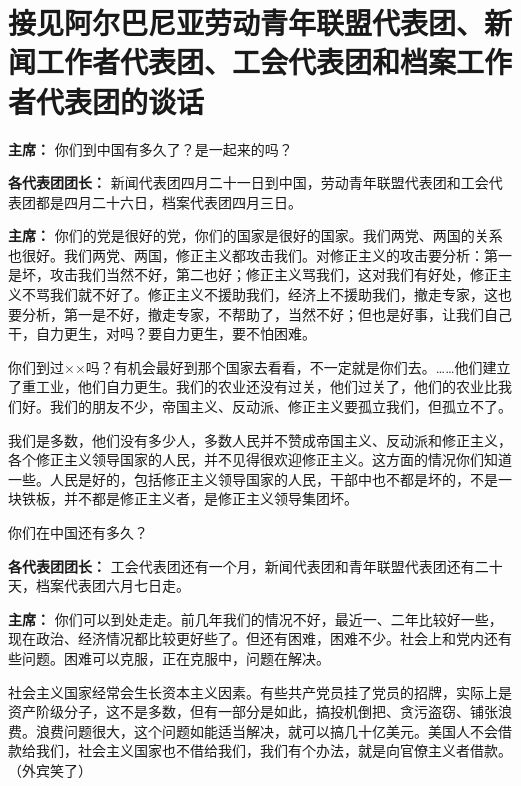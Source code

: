 \section[接见阿尔巴尼亚劳动青年联盟代表团、新闻工作者代表团、工会代表团和档案工作者代表团的谈话（一九六三年五月四日）]{接见阿尔巴尼亚劳动青年联盟代表团、新闻工作者代表团、工会代表团和档案工作者代表团的谈话}

\begin{duihua}
    
\item[\textbf{主席：}] 你们到中国有多久了？是一起来的吗？

\item[\textbf{各代表团团长：}] 新闻代表团四月二十一日到中国，劳动青年联盟代表团和工会代表团都是四月二十六日，档案代表团四月三日。

\item[\textbf{主席：}] 你们的党是很好的党，你们的国家是很好的国家。我们两党、两国的关系也很好。我们两党、两国，修正主义都攻击我们。对修正主义的攻击要分析：第一是坏，攻击我们当然不好，第二也好；修正主义骂我们，这对我们有好处，修正主义不骂我们就不好了。修正主义不援助我们，经济上不援助我们，撤走专家，这也要分析，第一是不好，撤走专家，不帮助了，当然不好；但也是好事，让我们自己干，自力更生，对吗？要自力更生，要不怕困难。

你们到过××吗？有机会最好到那个国家去看看，不一定就是你们去。……他们建立了重工业，他们自力更生。我们的农业还没有过关，他们过关了，他们的农业比我们好。我们的朋友不少，帝国主义、反动派、修正主义要孤立我们，但孤立不了。

我们是多数，他们没有多少人，多数人民并不赞成帝国主义、反动派和修正主义，各个修正主义领导国家的人民，并不见得很欢迎修正主义。这方面的情况你们知道一些。人民是好的，包括修正主义领导国家的人民，干部中也不都是坏的，不是一块铁板，并不都是修正主义者，是修正主义领导集团坏。

你们在中国还有多久？

\item[\textbf{各代表团团长：}] 工会代表团还有一个月，新闻代表团和青年联盟代表团还有二十天，档案代表团六月七日走。

\item[\textbf{主席：}] 你们可以到处走走。前几年我们的情况不好，最近一、二年比较好一些，现在政治、经济情况都比较更好些了。但还有困难，困难不少。社会上和党内还有些问题。困难可以克服，正在克服中，问题在解决。

社会主义国家经常会生长资本主义因素。有些共产党员挂了党员的招牌，实际上是资产阶级分子，这不是多数，但有一部分是如此，搞投机倒把、贪污盗窃、铺张浪费。浪费问题很大，这个问题如能适当解决，就可以搞几十亿美元。美国人不会借款给我们，社会主义国家也不借给我们，我们有个办法，就是向官僚主义者借款。（外宾笑了）


\end{duihua}
